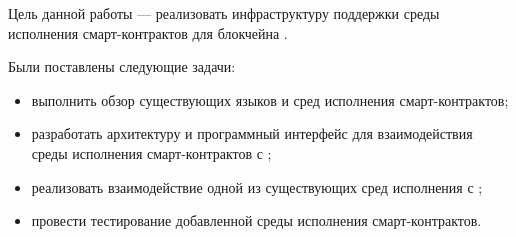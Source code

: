 Цель данной работы --- реализовать инфраструктуру поддержки среды исполнения смарт-контрактов для блокчейна .

Были поставлены следующие задачи:
\begin{itemize}
    \item выполнить обзор существующих языков и сред исполнения смарт-кон\-трак\-тов;
    \item разработать архитектуру и программный интерфейс для взаимодействия среды исполнения смарт-контрактов с ;
    \item реализовать взаимодействие одной из существующих сред исполнения с ;
    \item провести тестирование добавленной среды исполнения смарт-кон\-трак\-тов.
\end{itemize}